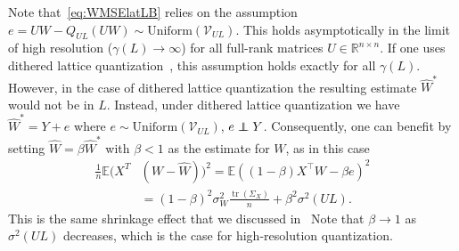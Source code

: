 \documentclass[journal]{IEEEtran}
\newcommand{\RR}{\mathbb{R}}
\newcommand{\trace}{\mathop{\mathrm{tr}}}
\newcommand{\Unif}{\mathrm{Uniform}}
\newcommand\indep{\protect\mathpalette{\protect\independenT}{\perp}}
\def\independenT#1#2{\mathrel{\rlap{$#1#2$}\mkern2mu{#1#2}}}
\def\EE{\mathbb{E}}
\newcommand{\m}{\mathcal}
\newenvironment{proof}[1][Proof]{\noindent\textbf{#1.} }{\ \rule{0.5em}{0.5em}}
\begin{document}
Note that~\eqref{eq:WMSElatLB} relies on the assumption $e=UW-Q_{UL}(UW)\sim\Unif(\m{V}_{UL})$. This holds asymptotically in the limit of high resolution ($\gamma(L)\to\infty$) for all full-rank matrices $U\in\RR^{n\times n}$. If one uses  dithered lattice quantization~\cite{ramiBook}, this assumption holds exactly for all $\gamma(L)$. However, in the case of dithered lattice quantization the resulting estimate $\hat{W}^*$ would not be in $L$. Instead, under dithered lattice quantization we have $\hat{W}^*=Y+e$ where $e\sim\Unif(\m{V}_{UL})$, $e\indep Y$. Consequently, one can benefit by setting $\hat{W}=\beta\hat{W}^*$ with $\beta<1$ as the estimate for $W$, as in this case
\begin{align}
\frac{1}{n}\EE(X^T&(W-\hat{W}))^2=\EE((1-\beta)X^\top W-\beta e)^2\nonumber\\
&=(1-\beta)^2 \sigma_W^2\frac{\trace(\Sigma_X)}{n}+\beta^2 \sigma^2(UL).    
\end{align}
This is the same shrinkage effect that we discussed in~\cite[Section I.b]{OP26part1}
Note that $\beta\to 1$ as $\sigma^2(UL)$ decreases, which is the case for high-resolution
quantization. 

\end{document}
